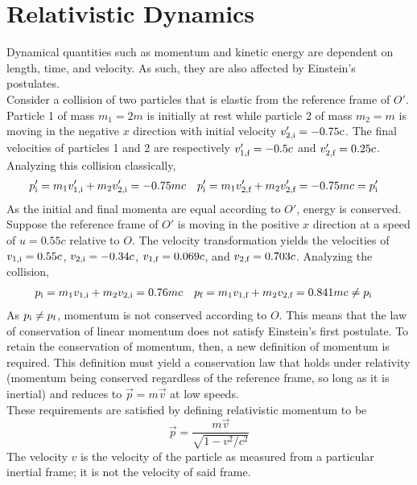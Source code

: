 \documentclass{subfiles}
\begin{document}
	\section{Relativistic Dynamics}
		Dynamical quantities such as momentum and kinetic energy are dependent on  length, time, and velocity. As such, they are also affected by Einstein's postulates. \\
		Consider a collision of two particles that is elastic from the reference frame of \(O'\). Particle 1 of mass \(m_1 = 2m\) is initially at rest while particle 2 of mass \(m_2 = m\) is moving in the negative \(x\) direction with initial velocity \(v_{\text{2,i}}' = -0.75c\). The final velocities of particles 1 and 2 are respectively \(v_{\text{1,f}}' = -0.5c\) and \(v_{\text{2,f}}' = 0.25c\). Analyzing this collision classically,
			\begin{align*}
				p_{\text{i}}' &= m_1v_{\text{1,i}}' + m_2v_{\text{2,i}}'
						= -0.75mc &
					p_{\text{i}}' &= m_1v_{\text{2,f}}' + m_2v_{\text{2,f}}'
						= -0.75mc
						= p_{\text{i}}'
			\end{align*}
			As the initial and final momenta are equal according to \(O'\), energy is conserved. \\
		Suppose the reference frame of \(O'\) is moving in the positive \(x\) direction at a speed of \(u = 0.55c\) relative to \(O\). The velocity transformation yields the velocities of \(v_{\text{1,i}} = 0.55c\), \(v_{\text{2,i}} = -0.34c\), \(v_{\text{1,f}} = 0.069c\), and \(v_{\text{2,f}} = 0.703c\). Analyzing the collision,
			\begin{align*}
				p_{\text{i}} &= m_1v_{\text{1,i}} + m_2v_{\text{2,i}}
						= 0.76mc &
					p_{\text{f}} &= m_1v_{\text{1,f}} + m_2v_{\text{2,f}}
						= 0.841mc
						\ne p_{\text{i}}
			\end{align*}
			As \(p_{\text{i}} \ne p_{\text{f}}\), momentum is not conserved according to \(O\). This means that the law of conservation of linear momentum does not satisfy Einstein's first postulate. To retain the conservation of momentum, then, a new definition of momentum is required. This definition must yield a conservation law that holds under relativity (momentum being conserved regardless of the reference frame, so long as it is inertial) and reduces to \(\vec{p} = m\vec{v}\) at low speeds. \\
			These requirements are satisfied by defining relativistic momentum to be
			\[\vec{p} = \frac{m\vec{v}}{\sqrt{1 - v^2/c^2}} \tag{relativistic momentum}\]
			The velocity \(v\) is the velocity of the particle as measured from a particular inertial frame; it is not the velocity of said frame. \\
\end{document}
